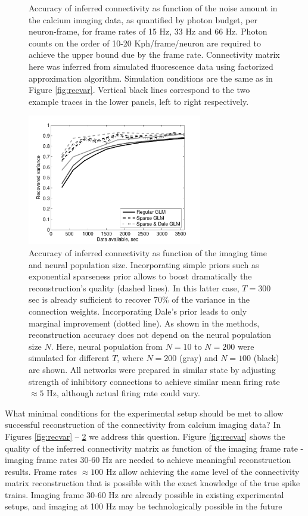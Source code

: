 \begin{figure}[h]
\begin{minipage}[c]{0.45\hsize}
\end{minipage}
\caption{Accuracy of inferred connectivity as function of the noise amount in the calcium imaging data, as quantified by photon budget, per neuron-frame, for frame rates of 15 Hz, 33 Hz and 66 Hz. Photon counts on the order of 10-20 Kph/frame/neuron are required to achieve the upper bound due by the frame rate. Connectivity matrix here was inferred from simulated fluorescence data using factorized approximation algorithm. Simulation conditions are the same as in Figure \ref{fig:recvar}.  Vertical black lines correspond to the two example traces in the lower panels, left to right respectively.}
\label{fig:recvar-SNR}
\end{figure}

\begin{figure}[h]
\centering
\includegraphics[width=3in]{../figs/FigureA7_recvar_NT}
\caption{Accuracy of inferred connectivity as function of the imaging time and neural population size. Incorporating simple priors such as exponential sparseness prior allows to boost dramatically the reconstruction's quality (dashed lines). In this latter case, $T=300$ sec is already sufficient to recover 70\% of the variance in the connection weights. Incorporating Dale's prior leads to only marginal improvement (dotted line). As shown in the methods, reconstruction accuracy does not depend on the neural population size $N$.
Here, neural population from $N=10$ to $N=200$ were simulated for different $T$, where
$N=200$ (gray) and $N=100$ (black) are shown. All networks were prepared in similar state by adjusting strength of inhibitory connections to achieve similar mean firing rate $\approx 5$ Hz, although actual firing rate could vary.
}
\label{fig:recvar-NT}
\end{figure}


What minimal conditions for the experimental setup should be met to allow successful reconstruction of the connectivity from calcium imaging data? In Figures \ref{fig:recvar} -- \ref{fig:recvar-NT} we address this question. Figure \ref{fig:recvar} shows the quality of the inferred connectivity matrix as function of the imaging frame rate - imaging frame rates 30-60 Hz are needed to achieve meaningful reconstruction results.
Frame rates $\approx 100$ Hz allow achieving the same level of the connectivity matrix reconstruction that is possible with the exact knowledge of the true spike trains.
Imaging frame 30-60 Hz are already possible in existing experimental setups, and imaging
at 100 Hz may be technologically possible in the future \cite{NguyenParker01,ReddySaggau05,Iyer06,SalomeBourdieu06,ReddySaggau08}

